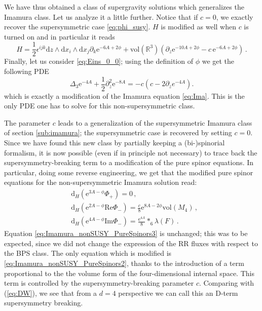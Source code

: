 \documentclass[12pt]{article}
\newcommand{\R}{\mathbb{R}}
\renewcommand{\Re}{\mathrm{Re}}
\renewcommand{\Im}{\mathrm{Im}}
\newcommand{\dd}{\mathrm{d}}
\newcommand{\e}{\mathrm{e}}
\newcommand{\vol}{\mathrm{vol}}
\begin{document}
We have thus obtained a class of supergravity solutions which generalizes the Imamura class. Let us analyze it a little further. Notice that if $c=0$, we exactly recover the supersymmetric case \eqref{eq:phi_susy}. $H$ is modified as well when $c$ is turned on and in particular it reads
\begin{equation}
\label{eq:Hdef_nonsusy_Ima}
H= \frac{1}{2} \epsilon^{ijk} \dd z \wedge \dd x_i \wedge \dd x_j \partial_k \e^{-6A+2\phi} + \vol(\R^3) ( \partial_z \e^{-10 A+2\phi}- c \, \e^{-6 A+2\phi}) \, .
\end{equation}
Finally, let us consider \eqref{eq:Eins_0_0}; using the definition of $\phi$ we get the following PDE
\begin{equation}
\label{eq:non-SUSY-Ima}
\Delta_3 \e^{-4A}+\frac{1}{2}\partial_{z}^2 \e^{-8A}=- c \left(c-2 \partial_{z} e^{-4 A}\right).
\end{equation}
which is exactly a modification of the Imamura equation \eqref{eq:Ima}. This is the only PDE one has to solve for this non-supersymmetric class.

The parameter $c$ leads to a generalization of the supersymmetric Imamura class of section \ref{sub:imamura}; the supersymmetric case is recovered by setting $c=0$. Since we have found this new class by partially keeping a (bi-)spinorial formalism, it is now possible (even if in principle not necessary) to trace back the supersymmetry-breaking term to a modification of the pure spinor equations. In particular, doing some reverse engineering, we get that the modified pure spinor equations for the non-supersymmetric Imamura solution read:
\begin{subequations}
\label{eq:Imamura_nonSUSY_PureSpinors}
\begin{align}
&\dd_H ( \e^{3A-\phi} \Phi_+) = 0 \, ,\label{eq:Imamura_nonSUSY_PureSpinors1}\\
&\dd_H( \e^{2A-\phi} \Re\Phi_-) = \frac{c}{8} \e^{8A-2\phi} \vol(M_4) \, , \label{eq:Imamura_nonSUSY_PureSpinors2}\\
&\dd_H ( \e^{4A-\phi}\Im\Phi_-) = \frac{\e^{4A}}{8} *_6 \lambda(F) \, . \label{eq:Imamura_nonSUSY_PureSpinors3}
\end{align}
\end{subequations} 
Equation \eqref{eq:Imamura_nonSUSY_PureSpinors3} is unchanged; this was to be expected, since we did not change the expression of the RR fluxes with respect to the BPS class. The only equation which is modified is \eqref{eq:Imamura_nonSUSY_PureSpinors2}, thanks to the introduction of a term proportional to the the volume form of the four-dimensional internal space. This term is controlled by the supersymmetry-breaking parameter $c$. Comparing with (\ref{eq:DW}), we see that from a $d=4$ perspective we can call this an D-term supersymmetry breaking.
\end{document}
